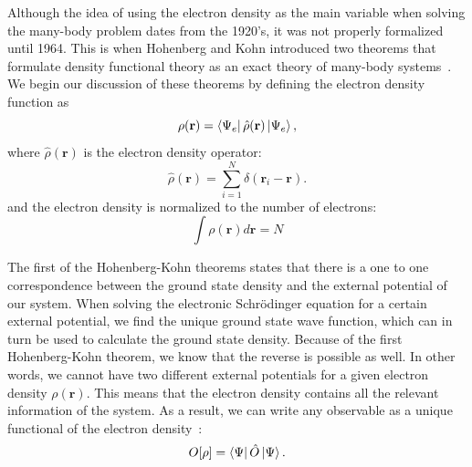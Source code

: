 \begin{refsection}
Although the idea of using the electron density as the main variable when 
solving the many-body problem dates from the 1920's, it was not properly 
formalized until 1964. This is when Hohenberg and Kohn introduced two theorems 
that formulate density functional theory as an exact theory of many-body 
systems~\cite{Hohenberg1964}. We begin our discussion of these theorems by 
defining the electron density function as 
\begin{equation} 
\rho(\mathbf{r}) = \bra{\Psi_e} \hat{\rho} (\mathbf{r}) \ket{\Psi_e}, 
\end{equation} 
where $\hat{\rho} (\mathbf{r})$ is the electron density operator: 
\begin{equation} 
\hat{\rho} (\mathbf{r}) = \sum_{i=1}^{N} \delta (\mathbf{r}_i - \mathbf{r}). 
\end{equation}
and the electron density is normalized to the number of electrons:
\begin{equation}
\int \rho (\mathbf{r}) d\mathbf{r} = N
\end{equation}
 
The first of the Hohenberg-Kohn theorems states that there is a one to one 
correspondence between the ground state density and the external potential of 
our system. When solving the electronic Schr\"odinger equation for a certain 
external potential, we find the unique ground state wave function, which can 
in turn be used to calculate the ground state density. Because of the first 
Hohenberg-Kohn theorem, we know that the reverse is possible as well. In other 
words, we cannot have two different external potentials for a given electron 
density $\rho(\mathbf{r})$. This means that the electron density contains all 
the relevant information of the system. As a result, we can write any 
observable as a unique functional of the electron 
density~\cite{Cottenier2013}: 
\begin{equation} 
O[\rho] = \bra{\Psi} \hat{O} \ket{\Psi}. 
\end{equation} 
 

\end{refsection}
